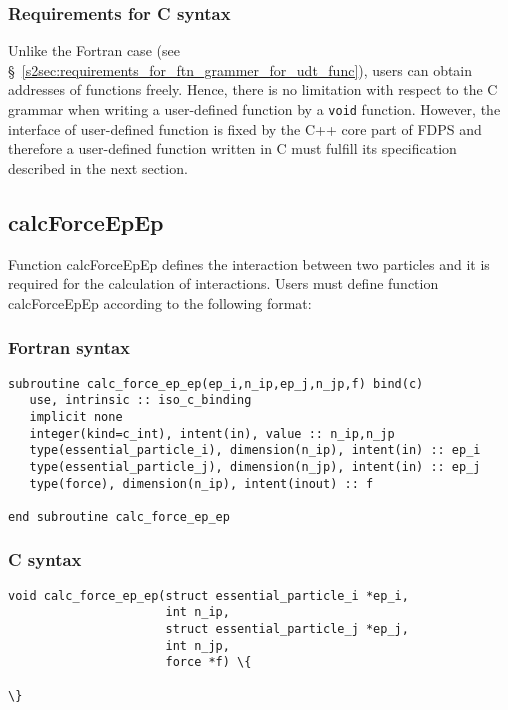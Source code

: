 \subsubsection{Requirements for C syntax}
Unlike the Fortran case (see \S~\ref{s2sec:requirements_for_ftn_grammer_for_udt_func}), users can obtain addresses of functions freely. Hence, there is no limitation with respect to the C grammar when writing a user-defined function by a \texttt{void} function. However, the interface of user-defined function is fixed by the C++ core part of FDPS and therefore a user-defined function written in C must fulfill its specification described in the next section.



\subsection{calcForceEpEp}
\label{subsec:calcForceEpEp}
Function calcForceEpEp defines the interaction between two particles and it is required for the calculation of interactions. Users must define function calcForceEpEp according to the following format:

\subsubsection*{Fortran syntax}
\begin{screen}
\begin{Verbatim}[commandchars=\\\{\}]
subroutine calc_force_ep_ep(ep_i,n_ip,ep_j,n_jp,f) bind(c)
   use, intrinsic :: iso_c_binding
   implicit none
   integer(kind=c_int), intent(in), value :: n_ip,n_jp
   type(essential_particle_i), dimension(n_ip), intent(in) :: ep_i
   type(essential_particle_j), dimension(n_jp), intent(in) :: ep_j
   type(force), dimension(n_ip), intent(inout) :: f
   
end subroutine calc_force_ep_ep
\end{Verbatim}
\end{screen}

\subsubsection*{C syntax}
\begin{screen}
\begin{Verbatim}[commandchars=\\\{\}]
void calc_force_ep_ep(struct essential_particle_i *ep_i,
                      int n_ip,
                      struct essential_particle_j *ep_j,
                      int n_jp,
                      force *f) \{
                        
\}
\end{Verbatim}
\end{screen}


